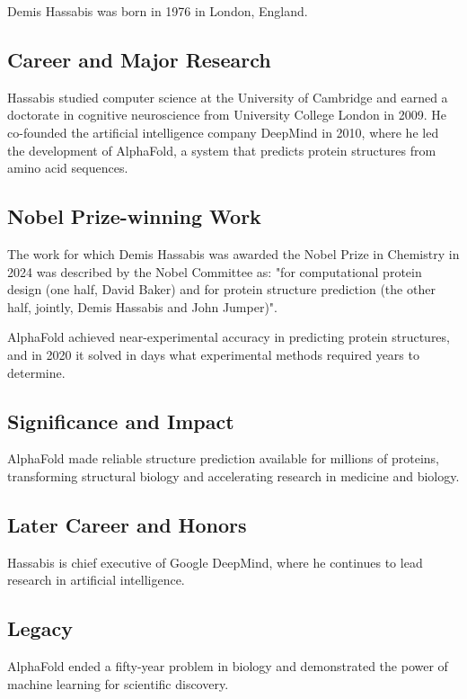 Demis Hassabis was born in 1976 in London, England.

\subsection*{Career and Major Research}

Hassabis studied computer science at the University of Cambridge and earned a doctorate in cognitive neuroscience from University College London in 2009. He co-founded the artificial intelligence company DeepMind in 2010, where he led the development of AlphaFold, a system that predicts protein structures from amino acid sequences.

\subsection*{Nobel Prize-winning Work}

The work for which Demis Hassabis was awarded the Nobel Prize in Chemistry in 2024 was described by the Nobel Committee as: "for computational protein design (one half, David Baker) and for protein structure prediction (the other half, jointly, Demis Hassabis and John Jumper)".

AlphaFold achieved near-experimental accuracy in predicting protein structures, and in 2020 it solved in days what experimental methods required years to determine.

\subsection*{Significance and Impact}

AlphaFold made reliable structure prediction available for millions of proteins, transforming structural biology and accelerating research in medicine and biology.

\subsection*{Later Career and Honors}

Hassabis is chief executive of Google DeepMind, where he continues to lead research in artificial intelligence.

\subsection*{Legacy}

AlphaFold ended a fifty-year problem in biology and demonstrated the power of machine learning for scientific discovery.

